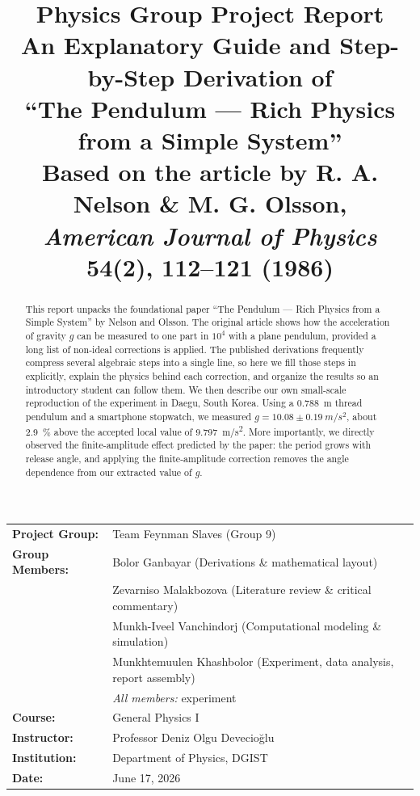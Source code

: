 \documentclass[11pt]{article}
\title{\vspace{-1.5em}\textbf{Physics Group Project Report}\\[0.4em]
\large An Explanatory Guide and Step-by-Step Derivation of\\
``The Pendulum --- Rich Physics from a Simple System''\\[0.3em]
\normalsize Based on the article by R. A. Nelson \& M. G. Olsson,\\
\textit{American Journal of Physics} \textbf{54}(2), 112--121 (1986)}
\author{}
\date{}
\newcommand{\teamname}{Team Feynman Slaves}
\begin{document}
\maketitle
\vspace{-3em}

\begin{center}
\begin{tabular}{ll}
\textbf{Project Group:} & \teamname{} (Group 9)\\
\textbf{Group Members:} & Bolor Ganbayar (Derivations \& mathematical layout)\\
 & Zevarniso Malakbozova (Literature review \& critical commentary)\\
 & Munkh-Iveel Vanchindorj (Computational modeling \& simulation)\\
 & Munkhtemuulen Khashbolor (Experiment, data analysis, report assembly)\\
 & \textit{All members:} experiment\\
\textbf{Course:} & General Physics I\\
\textbf{Instructor:} & Professor Deniz Olgu Devecio\u{g}lu\\
\textbf{Institution:} & Department of Physics, DGIST\\
\textbf{Date:} & June 17, 2026\\
\end{tabular}
\end{center}

\begin{abstract}
\noindent This report unpacks the foundational paper ``The Pendulum --- Rich Physics
from a Simple System'' by Nelson and Olsson. The original article shows how the
acceleration of gravity $g$ can be measured to one part in $10^4$ with a plane pendulum,
provided a long list of non-ideal corrections is applied. The published derivations
frequently compress several algebraic steps into a single line, so here we fill those
steps in explicitly, explain the physics behind each correction, and organize the
results so an introductory student can follow them. We then describe our own
small-scale reproduction of the experiment in Daegu, South Korea. Using a \SI{0.788}{m}
thread pendulum and a smartphone stopwatch, we measured $g = 10.08 \pm 0.19~\si{m/s^2}$,
about \SI{2.9}{\percent} above the accepted local value of \SI{9.797}{m/s^2}. More
importantly, we directly observed the finite-amplitude effect predicted by the paper:
the period grows with release angle, and applying the finite-amplitude correction
removes the angle dependence from our extracted value of $g$.
\end{abstract}
\end{document}

